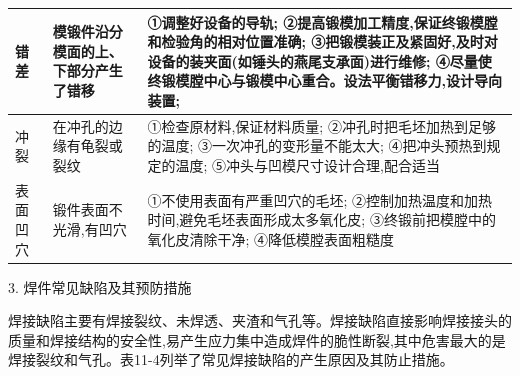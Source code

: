 \documentclass[UTF8]{ctexbook}
\newcommand{\◎}{\ensuremath{\bigcirc}}
\begin{document}
\begin{longtable}[H]{|l|p{5cm}|p{7cm}|}
\hline
错差 & 模锻件沿分模面的上、下部分产生了错移 & ①调整好设备的导轨; \newline ②提高锻模加工精度,保证终锻模膛和检验角的相对位置准确; \newline ③把锻模装正及紧固好,及时对设备的装夹面(如锤头的燕尾支承面)进行维修; \newline ④尽量使终锻模膛中心与锻模中心重合。设法平衡错移力,设计导向装置; \\
\hline
冲裂 & 在冲孔的边缘有龟裂或裂纹 & ①检查原材料,保证材料质量; \newline ②冲孔时把毛坯加热到足够的温度; \newline ③一次冲孔的变形量不能太大; \newline ④把冲头预热到规定的温度; \newline ⑤冲头与凹模尺寸设计合理,配合适当 \\
\hline
表面凹穴 & 锻件表面不光滑,有凹穴 & ①不使用表面有严重凹穴的毛坯; \newline ②控制加热温度和加热时间,避免毛坯表面形成太多氧化皮; \newline ③终锻前把模膛中的氧化皮清除干净; \newline ④降低模膛表面粗糙度 \\
\hline
\end{longtable}

3. 焊件常见缺陷及其预防措施

焊接缺陷主要有焊接裂纹、未焊透、夹渣和气孔等。焊接缺陷直接影响焊接接头的质量和焊接结构的安全性,易产生应力集中造成焊件的脆性断裂,其中危害最大的是焊接裂纹和气孔。表11-4列举了常见焊接缺陷的产生原因及其防止措施。
\end{document}
